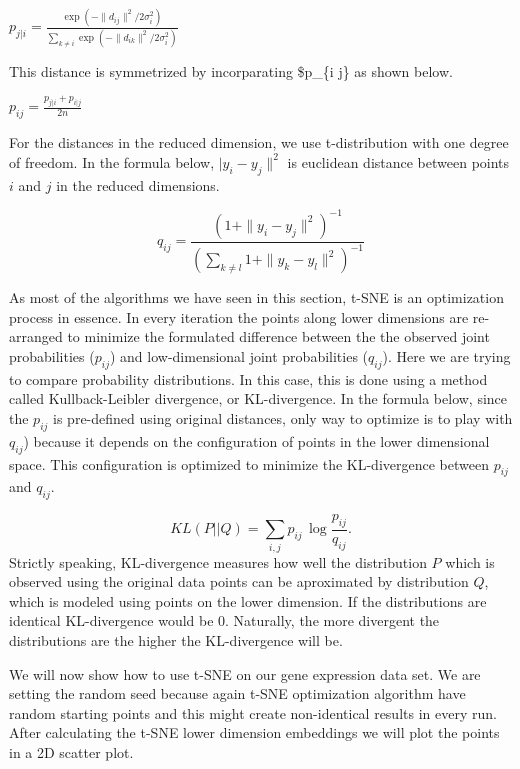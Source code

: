 \documentclass[12pt,]{krantz}
\newenvironment{Shaded}{\begin{snugshade}}{\end{snugshade}}
\newcommand{\CommentTok}[1]{\textcolor[rgb]{0.56,0.35,0.01}{\textit{#1}}}
\newcommand{\DataTypeTok}[1]{\textcolor[rgb]{0.13,0.29,0.53}{#1}}
\newcommand{\DecValTok}[1]{\textcolor[rgb]{0.00,0.00,0.81}{#1}}
\newcommand{\KeywordTok}[1]{\textcolor[rgb]{0.13,0.29,0.53}{\textbf{#1}}}
\newcommand{\NormalTok}[1]{#1}
\newcommand{\OperatorTok}[1]{\textcolor[rgb]{0.81,0.36,0.00}{\textbf{#1}}}
\newcommand{\StringTok}[1]{\textcolor[rgb]{0.31,0.60,0.02}{#1}}
\theoremstyle{definition}
\theoremstyle{definition}
\theoremstyle{definition}
\theoremstyle{remark}
\begin{document}
\(p_{j | i} = \frac{\exp(-\|d_{ij}\|^2 / 2 σ_i^2)}{∑_{k \neq i} \exp(-\|d_{ik}\|^2 / 2 σ_i^2)}\)

This distance is symmetrized by incorparating \$p\_\{i \textbar{} j\} as
shown below.

\(p_{i j}=\frac{p_{j|i} + p_{i|j}}{2n}\)

For the distances in the reduced dimension, we use t-distribution with
one degree of freedom. In the formula below, \(| y_i-y_j\|^2\) is
euclidean distance between points \(i\) and \(j\) in the reduced
dimensions.

\[
q_{i j} = \frac{(1+ \| y_i-y_j\|^2)^{-1}}{(∑_{k \neq l} 1+ \| y_k-y_l\|^2)^{-1} }
\]

As most of the algorithms we have seen in this section, t-SNE is an
optimization process in essence. In every iteration the points along
lower dimensions are re-arranged to minimize the formulated difference
between the the observed joint probabilities (\(p_{i j}\)) and
low-dimensional joint probabilities (\(q_{i j}\)). Here we are trying to
compare probability distributions. In this case, this is done using a
method called Kullback-Leibler divergence, or KL-divergence. In the
formula below, since the \(p_{i j}\) is pre-defined using original
distances, only way to optimize is to play with \(q_{i j}\)) because it
depends on the configuration of points in the lower dimensional space.
This configuration is optimized to minimize the KL-divergence between
\(p_{i j}\) and \(q_{i j}\).

\[
KL(P||Q) = \sum_{i, j} p_{ij} \, \log \frac{p_{ij}}{q_{ij}}.
\] Strictly speaking, KL-divergence measures how well the distribution
\(P\) which is observed using the original data points can be
aproximated by distribution \(Q\), which is modeled using points on the
lower dimension. If the distributions are identical KL-divergence would
be 0. Naturally, the more divergent the distributions are the higher the
KL-divergence will be.

We will now show how to use t-SNE on our gene expression data set. We
are setting the random seed because again t-SNE optimization algorithm
have random starting points and this might create non-identical results
in every run. After calculating the t-SNE lower dimension embeddings we
will plot the points in a 2D scatter plot.

\begin{Shaded}
\end{Shaded}
\end{document}
